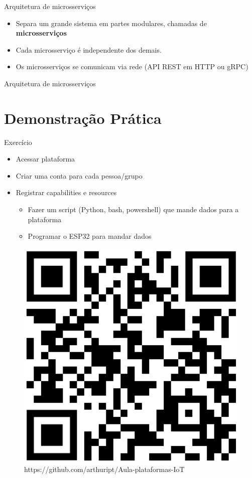 \documentclass[aspectratio=169,xcolor=dvipsnames]{beamer}
\begin{document}
\begin{frame}{Arquitetura de microsserviços}
\begin{itemize}
    \item Separa um grande sistema em partes modulares, chamadas de \textbf{microsserviços}
    \item Cada microsserviço é independente dos demais.
    \item Os microsserviços se comunicam via rede (API REST em HTTP ou gRPC)
\end{itemize}
\end{frame}

\begin{frame}{Arquitetura de microsserviços}
\begin{figure}
    \centering
    \scalebox{.6}{
    
    }
\end{figure}
\end{frame}



\section{Demonstração Prática}
\begin{frame}{Exercício}
\begin{itemize}
    \item  Acessar plataforma
    \item  Criar uma conta para cada pessoa/grupo
    \item  Registrar capabilities e resources
    \begin{itemize}
        \item Fazer um script (Python, bash, powershell) que mande dados para a plataforma
        \item Programar o ESP32 para mandar dados
    \end{itemize}
\end{itemize}
\begin{figure}
    \centering
    \includegraphics[width=0.3\linewidth]{QR-code-aula-mestrado.png}
    \caption{https://github.com/arthuript/Aula-plataformas-IoT}
\end{figure}
\end{frame}
\end{document}
